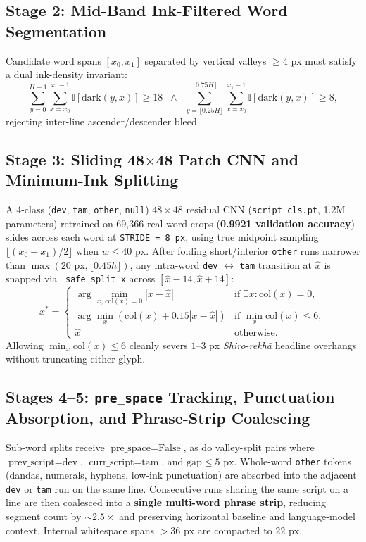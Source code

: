 \documentclass[10pt,twocolumn]{article}
\begin{document}
\subsection{Stage 2: Mid-Band Ink-Filtered Word Segmentation}
Candidate word spans $[x_0, x_1]$ separated by vertical valleys $\ge 4\text{ px}$ must satisfy a dual ink-density invariant:
\begin{equation}
\sum_{y=0}^{H-1} \sum_{x=x_0}^{x_1-1} \mathbb{I}[\text{dark}(y, x)] \ge 18 \;\;\land\;\; \sum_{y=\lfloor 0.25H \rfloor}^{\lceil 0.75H \rceil} \sum_{x=x_0}^{x_1-1} \mathbb{I}[\text{dark}(y, x)] \ge 8,
\end{equation}
rejecting inter-line ascender/descender bleed.

\subsection{Stage 3: Sliding 48$\times$48 Patch CNN and Minimum-Ink Splitting}
A 4-class (\texttt{dev}, \texttt{tam}, \texttt{other}, \texttt{null}) $48\times 48$ residual CNN (\texttt{script\_cls.pt}, 1.2M parameters) retrained on 69,366 real word crops (\textbf{0.9921 validation accuracy}) slides across each word at \texttt{STRIDE = 8 px}, using true midpoint sampling $\lfloor(x_0+x_1)/2\rfloor$ when $w \le 40\text{ px}$. After folding short/interior \texttt{other} runs narrower than $\max(20\text{ px}, \lfloor 0.45h \rfloor)$, any intra-word \texttt{dev} $\leftrightarrow$ \texttt{tam} transition at $\hat{x}$ is snapped via \texttt{\_safe\_split\_x} across $[\hat{x}-14, \hat{x}+14]$:
\begin{equation}
x^* = \begin{cases}
\arg\min_{x,\, \text{col}(x)=0} |x - \hat{x}| & \text{if } \exists x: \text{col}(x)=0, \\
\arg\min_{x} \left(\text{col}(x) + 0.15|x - \hat{x}|\right) & \text{if } \min_x \text{col}(x) \le 6, \\
\hat{x} & \text{otherwise.}
\end{cases}
\end{equation}
Allowing $\min_x \text{col}(x) \le 6$ cleanly severs $1\text{--}3\text{ px}$ \emph{Shiro-rekh\={a}} headline overhangs without truncating either glyph.

\subsection{Stages 4--5: \texttt{pre\_space} Tracking, Punctuation Absorption, and Phrase-Strip Coalescing}
Sub-word splits receive $\text{pre\_space} = \text{False}$, as do valley-split pairs where $\text{prev\_script} = \text{dev}$, $\text{curr\_script} = \text{tam}$, and $\text{gap} \le 5\text{ px}$. Whole-word \texttt{other} tokens (dandas, numerals, hyphens, low-ink punctuation) are absorbed into the adjacent \texttt{dev} or \texttt{tam} run on the same line. Consecutive runs sharing the same script on a line are then coalesced into a \textbf{single multi-word phrase strip}, reducing segment count by $\sim 2.5\times$ and preserving horizontal baseline and language-model context. Internal whitespace spans $> 36\text{ px}$ are compacted to $22\text{ px}$.
\end{document}
